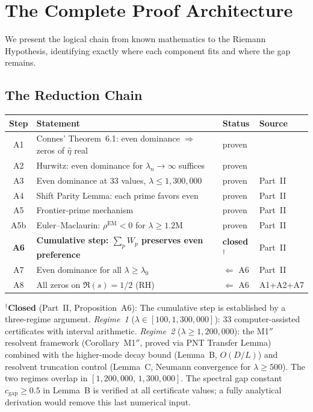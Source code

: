 \documentclass[12pt,a4paper]{article}
\theoremstyle{definition}
\theoremstyle{remark}
\begin{document}
\section{The Complete Proof Architecture}
\label{sec:architecture}

We present the logical chain from known mathematics to the Riemann Hypothesis, identifying exactly where each component fits and where the gap remains.

\subsection{The Reduction Chain}

\begin{center}
\renewcommand{\arraystretch}{1.3}
\begin{tabular}{c|p{7cm}|l|l}
\textbf{Step} & \textbf{Statement} & \textbf{Status} & \textbf{Source} \\\hline
A1 & Connes' Theorem~6.1: even dominance $\Rightarrow$ zeros of $\hat{\eta}$ real & proven & \cite{Connes2025} \\
A2 & Hurwitz: even dominance for $\lambda_n \to \infty$ suffices & proven & \cite{Connes2025} \\
A3 & Even dominance at $33$ values, $\lambda \leq 1{,}300{,}000$ & proven & Part~II \\
A4 & Shift Parity Lemma: each prime favors even & proven & Part~II \\
A5 & Frontier-prime mechanism & proven & Part~II \\
A5b & Euler--Maclaurin: $\rho^{\mathrm{EM}} < 0$ for $\lambda \geq 1.2\mathrm{M}$ & proven & Part~II \\
\textbf{A6} & \textbf{Cumulative step: $\sum_p W_p$ preserves even preference} & \textbf{closed${}^\dagger$} & Part~II \\
A7 & Even dominance for all $\lambda \geq \lambda_0$ & $\Leftarrow$ A6 & Part~II \\
A8 & All zeros on $\Re(s) = 1/2$ (RH) & $\Leftarrow$ A6 & A1+A2+A7
\end{tabular}
\end{center}

\noindent${}^\dagger$\textbf{Closed} (Part~II, Proposition~A6): The cumulative step is established by a three-regime argument. \emph{Regime~1} ($\lambda \in [100, 1{,}300{,}000]$): $33$ computer-assisted certificates with interval arithmetic. \emph{Regime~2} ($\lambda \geq 1{,}200{,}000$): the M1$''$ resolvent framework (Corollary~M1$''$, proved via PNT Transfer Lemma) combined with the higher-mode decay bound (Lemma~B, $O(D/L)$) and resolvent truncation control (Lemma~C, Neumann convergence for $\lambda \geq 500$). The two regimes overlap in $[1{,}200{,}000,\, 1{,}300{,}000]$. The spectral gap constant $c_{\mathrm{gap}} \geq 0.5$ in Lemma~B is verified at all certificate values; a fully analytical derivation would remove this last numerical input.
\end{document}
